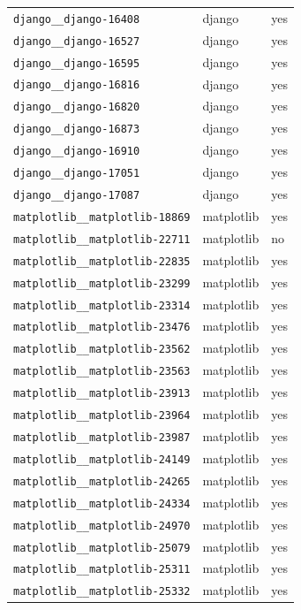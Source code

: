 \begin{longtable}{@{}p{}lp{}@{}}
\texttt{django\_\_django-16408} & django & yes \\
\texttt{django\_\_django-16527} & django & yes \\
\texttt{django\_\_django-16595} & django & yes \\
\texttt{django\_\_django-16816} & django & yes \\
\texttt{django\_\_django-16820} & django & yes \\
\texttt{django\_\_django-16873} & django & yes \\
\texttt{django\_\_django-16910} & django & yes \\
\texttt{django\_\_django-17051} & django & yes \\
\texttt{django\_\_django-17087} & django & yes \\
\texttt{matplotlib\_\_matplotlib-18869} & matplotlib & yes \\
\texttt{matplotlib\_\_matplotlib-22711} & matplotlib & no \\
\texttt{matplotlib\_\_matplotlib-22835} & matplotlib & yes \\
\texttt{matplotlib\_\_matplotlib-23299} & matplotlib & yes \\
\texttt{matplotlib\_\_matplotlib-23314} & matplotlib & yes \\
\texttt{matplotlib\_\_matplotlib-23476} & matplotlib & yes \\
\texttt{matplotlib\_\_matplotlib-23562} & matplotlib & yes \\
\texttt{matplotlib\_\_matplotlib-23563} & matplotlib & yes \\
\texttt{matplotlib\_\_matplotlib-23913} & matplotlib & yes \\
\texttt{matplotlib\_\_matplotlib-23964} & matplotlib & yes \\
\texttt{matplotlib\_\_matplotlib-23987} & matplotlib & yes \\
\texttt{matplotlib\_\_matplotlib-24149} & matplotlib & yes \\
\texttt{matplotlib\_\_matplotlib-24265} & matplotlib & yes \\
\texttt{matplotlib\_\_matplotlib-24334} & matplotlib & yes \\
\texttt{matplotlib\_\_matplotlib-24970} & matplotlib & yes \\
\texttt{matplotlib\_\_matplotlib-25079} & matplotlib & yes \\
\texttt{matplotlib\_\_matplotlib-25311} & matplotlib & yes \\
\texttt{matplotlib\_\_matplotlib-25332} & matplotlib & yes \\

\end{longtable}
